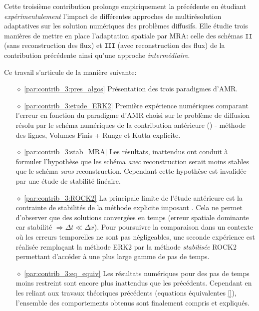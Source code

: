 Cette troisième contribution prolonge empiriquement la précédente
en étudiant \emph{expérimentalement} l'impact de différentes approches de multirésolution adaptatives sur les solution numériques des problèmes diffusifs. 
Elle étudie trois manières de mettre en place l'adaptation spatiale par MRA:
celle des schémas \texttt{II} (sans reconstruction des flux) et
\texttt{III} (avec reconstruction des flux) de la contribution précédente
ainsi qu'une approche \textit{intermédiaire}.\par
Ce travail s'articule de la manière suivante:
\begin{itemize}
\item[$\diamond$]\ref{par:contrib_3:pres_algos} Présentation des trois paradigmes d'AMR.
\item[$\diamond$]\ref{par:contrib_3:etude_ERK2} Première expérience numériques comparant l'erreur en fonction du paradigme d'AMR choisi
sur le problème de diffusion résolu par le schéma numériques de la contribution antérieure () - méthode des lignes, Volumes Finis + Runge et Kutta explicite.
\item[$\diamond$]\ref{par:contrib_3:stab_MRA} Les résultats, inattendus
ont conduit à formuler l'hypothèse que les schéma \emph{avec} reconstruction serait moins stables que le schéma \emph{sans} reconstruction.
Cependant cette hypothèse est invalidée par une étude de stabilité linéaire.
\item[$\diamond$]\ref{par:contrib_3:ROCK2} La principale limite de l'étude antérieure est
la contrainte de stabilités de la méthode explicite imposant . Cela ne permet d'observer que des solutions convergées en temps (erreur spatiale dominante car stabilité $\Rightarrow \Delta t \ll \Delta x$).
Pour poursuivre la comparaison dans un contexte où les erreurs temporelles ne sont pas négligeables, une seconde expérience 
est réalisée remplaçant la méthode ERK2 par la méthode \emph{stabilisée} ROCK2 \cite{abdulle2002fourth} permettant d'accéder à 
une plus large gamme de pas de temps.
\item[$\diamond$]\ref{par:contrib_3:eq_equiv} Les résultats numériques pour des pas de temps moins restreint sont encore plus inattendus que les précédents.
Cependant en les reliant aux travaux théoriques précédents (equations équivalentes \ref{}), l'ensemble des comportements obtenus sont finalement compris et expliqués.
\end{itemize}